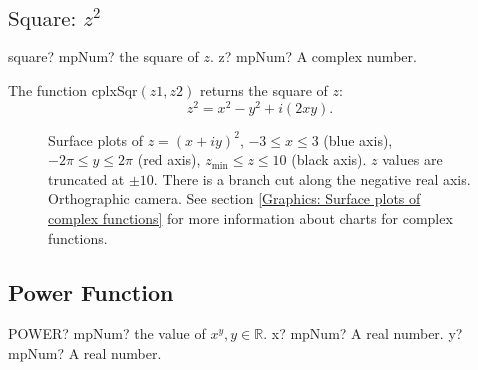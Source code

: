 \subsection{\texorpdfstring{$\text{Square: }z^2$}{Square}}

\begin{mpFunctionsExtract}
	\mpFunctionOne
	{square? mpNum? the square of $z$.}
	{z? mpNum? A complex number.}
\end{mpFunctionsExtract}

\vspace{0.3cm}
The function \textsf{cplxSqr$(z1, z2)$} returns the square of $z$: 
\begin{equation}
	z^2 = x^2-y^2 + i(2xy).
\end{equation}



\begin{figure}[ht]%
	\centering
	\qquad
	\caption[Complex Square]{Surface plots of $z = (x + iy)^2$, $-3 \leq x \leq 3$ (blue axis), $-2 \pi \leq y \leq 2\pi$ (red axis), $z_{\text{min}} \leq z \leq 10$ (black axis). $z$ values are truncated at $\pm 10$. There is a branch cut along the negative real axis. Orthographic camera. See section \ref{Graphics: Surface plots of complex functions} for more information about charts for complex functions.} 
	\label{fig:Complex Square}%
\end{figure}



\newpage
\subsection{Power Function}

\begin{mpFunctionsExtract}
	\mpWorksheetFunctionTwoNotImplemented
	{POWER? mpNum? the value of $x^y, y \in  \mathbb{R}$.}
	{x? mpNum? A real number.}
	{y? mpNum? A real number.}
\end{mpFunctionsExtract}

\vspace{0.6cm}

